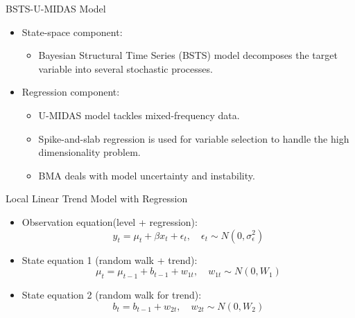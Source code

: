 \documentclass[14pt,xcolor=dvipsnames]{beamer}
\begin{document}
\begin{frame}{BSTS-U-MIDAS Model}

	\begin{itemize}
		\item State-space component:
		\begin{itemize}%
			\item Bayesian Structural Time Series (BSTS) model decomposes the target variable into several stochastic processes.
		
		\end{itemize}
		
		\item Regression component:
				\begin{itemize}%
					\item U-MIDAS model tackles mixed-frequency data.
					\item Spike-and-slab regression is used for variable selection to handle the high dimensionality problem.
					\item BMA deals with model uncertainty and instability.
				\end{itemize}
		
	\end{itemize}
\end{frame}
\begin{frame}{Local Linear Trend Model with Regression}

	\begin{block}{}
\begin{itemize}
	
	\item {Observation equation(level + regression): $$y_t = \mu_t + \beta x_t + \epsilon_{t}, \quad \epsilon_{t} \sim N(0, \sigma_{\epsilon}^2)$$}	
	\item {State equation 1 (random walk + trend): $$\mu_t = \mu_{t-1} + b_{t-1} + w_{1t}, \quad w_{1t} \sim N(0, W_{1})$$}	
	\item {State equation 2 (random walk for trend): $$b_t = b_{t-1} + w_{2t}, \quad w_{2t} \sim N(0, W_{2})$$}
\end{itemize}
	\end{block}
	

\end{frame}
\end{document}
